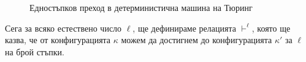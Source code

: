 \begin{important}
\begin{figure}[H]
  \begin{subfigure}[b]{0.5\textwidth}
    \begin{prooftree}
    \end{prooftree}
    \vspace*{2mm}
  \end{subfigure}
  ~
  \begin{subfigure}[b]{0.5\textwidth}
    \begin{prooftree}
    \end{prooftree}
    \vspace*{2mm}
  \end{subfigure}
  
  \begin{subfigure}[b]{0.5\textwidth}
    \begin{prooftree}
    \end{prooftree}
    \vspace*{2mm}
  \end{subfigure}
  ~
  \begin{subfigure}[b]{0.5\textwidth}
    \begin{prooftree}
    \end{prooftree}
    \vspace*{2mm}
  \end{subfigure}

  \begin{prooftree}
  \end{prooftree}
  \caption{Едностъпков преход в детерминистична машина на Тюринг}
\end{figure}
\end{important}


Сега за всяко естествено число $\ell$, ще дефинираме релацията $\vdash^{\ell}$,
която ще казва, че от конфигурацията $\kappa$ можем да достигнем до конфигурацията $\kappa'$ за $\ell$ на брой стъпки.

